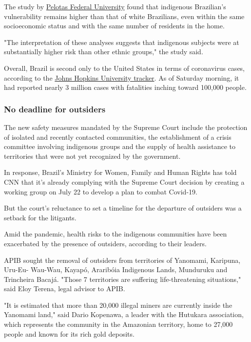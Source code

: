 The study by \href{https://portal.ufpel.edu.br/en/}{Pelotas Federal
University} found that indigenous Brazilian's vulnerability remains
higher than that of white Brazilians, even within the same socioeconomic
status and with the same number of residents in the home.

"The interpretation of these analyses suggests that indigenous subjects
were at substantially higher risk than other ethnic groups," the study
said.

Overall, Brazil is second only to the United States in terms of
coronavirus cases, according to the
\href{https://coronavirus.jhu.edu/map.html}{Johns Hopkins University
tracker}. As of Saturday morning, it had reported nearly 3 million cases
with fatalities inching toward 100,000 people.

\hypertarget{no-deadline-for-outsiders}{%
\subsubsection{No deadline for
outsiders}\label{no-deadline-for-outsiders}}

The new safety measures mandated by the Supreme Court include the
protection of isolated and recently contacted communities, the
establishment of a crisis committee involving indigenous groups and the
supply of health assistance to territories that were not yet recognized
by the government.

In response, Brazil's Ministry for Women, Family and Human Rights has
told CNN that it's already complying with the Supreme Court decision by
creating a working group on July 22 to develop a plan to combat
Covid-19.

But the court's reluctance to set a timeline for the departure of
outsiders was a setback for the litigants.

Amid the pandemic, health risks to the indigenous communities have been
exacerbated by the presence of outsiders, according to their leaders.

APIB sought the removal of outsiders from territories of Yanomami,
Karipuna, Uru-Eu- Wau-Wau, Kayapó, Araribóia Indigenous Lands, Munduruku
and Trincheira Bacajá. "Those 7 territories are suffering
life-threatening situations," said Eloy Terena, legal advisor to APIB.

"It is estimated that more than 20,000 illegal miners are currently
inside the Yanomami land," said Dario Kopenawa, a leader with the
Hutukara association, which represents the community in the Amazonian
territory, home to 27,000 people and known for its rich gold deposits.

